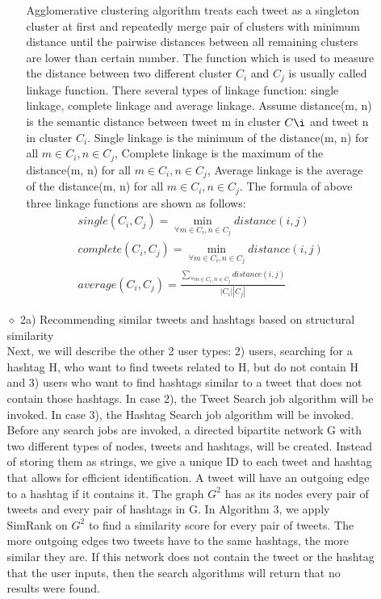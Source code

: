 \documentclass[10pt]{article}
\begin{document}
\begin{itemize}
\begin{itemize}
\begin{itemize}
Agglomerative clustering algorithm treats each tweet as a singleton cluster at first and repeatedly merge 
pair of clusters with minimum distance until the pairwise distances between all remaining clusters are lower than certain number. The function which is used to measure the distance between two different cluster $C_i$ and $C_j$ is usually called linkage function. There several types of linkage function: single linkage, complete linkage and average linkage. Assume distance(m, n) is the semantic distance between tweet m in cluster $C\i$ and tweet n in cluster $C_i$. Single linkage is the minimum of the distance(m, n) for all $m \in C_i, n \in C_j $, Complete linkage is the maximum of the distance(m, n) for all $m \in C_i, n \in C_j $, Average linkage is the average of the distance(m, n) for all $m \in C_i, n \in C_j $. The formula of above three linkage functions are shown as follows:
\begin{equation*}
  \begin{aligned}
 single(C_i, C_j) =\min_{\forall m \in C_i, n \in C_j} {distance(i, j)} \\
 complete(C_i, C_j) =\min_{\forall m \in C_i, n \in C_j} {distance(i, j)} \\
average(C_i, C_j) =\frac {\sum\limits_{\forall m \in C_i, n \in C_j} {distance(i, j)}}{|C_i| |C_j|  }
 \end{aligned}
 \end{equation*}

\end{itemize}


\item[$\diamond$]{2a) Recommending similar tweets and hashtags based on structural similarity}\\

Next, we will describe the other 2 user types: 2) users, searching for a hashtag H, who want to find tweets related to H, but do not contain H and 3) users who want to find hashtags similar to a tweet that does not contain those hashtags. In case 2), the Tweet Search job algorithm will be invoked. In case 3), the Hashtag Search job algorithm will be invoked. \\

Before any search jobs are invoked, a directed bipartite network G with two different types of nodes, tweets and hashtags, will be created. Instead of storing them as strings, we give a unique ID to each tweet and hashtag that allows for efficient identification. A tweet will have an outgoing edge to a hashtag if it contains it. The graph $ G^2$ has as its nodes every pair of tweets and every pair of hashtags in G. In Algorithm 3, we apply SimRank on $ G^2$  to find a similarity score for every pair of tweets. The more outgoing edges two tweets have to the same hashtags, the more similar they are. If this network does not contain the tweet or the hashtag that the user inputs, then the search algorithms will return that no results were found. \\


\end{itemize}
\end{itemize}
\end{document}
